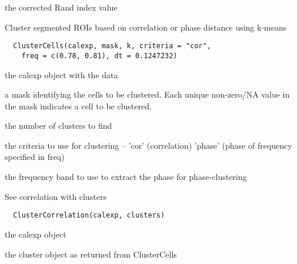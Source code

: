 \documentclass[a4paper]{book}
\begin{document}
%
\begin{Value}
the corrected Rand index value
\end{Value}
%
\begin{Description}\relax
Cluster segmented ROIs based on correlation or phase
distance using k-means
\end{Description}
%
\begin{Usage}
\begin{verbatim}
  ClusterCells(calexp, mask, k, criteria = "cor",
    freq = c(0.78, 0.81), dt = 0.1247232)
\end{verbatim}
\end{Usage}
%
\begin{Arguments}
\begin{ldescription}
\item[\code{calexp}] the calexp object with the data

\item[\code{mask}] a mask identifying the cells to be clustered.
Each unique non-zero/NA value in the mask indicates a
cell to be clustered.

\item[\code{k}] the number of clusters to find

\item[\code{criteria}] the criteria to use for clustering --
'cor' (correlation) 'phase' (phase of frequency specified
in freq)

\item[\code{freq}] the frequency band to use to extract the
phase for phase-clustering
\end{ldescription}
\end{Arguments}
%
\begin{Description}\relax
See correlation with clusters
\end{Description}
%
\begin{Usage}
\begin{verbatim}
  ClusterCorrelation(calexp, clusters)
\end{verbatim}
\end{Usage}
%
\begin{Arguments}
\begin{ldescription}
\item[\code{calexp}] the calexp object

\item[\code{clusters}] the cluster object as returned from
ClusterCells
\end{ldescription}
\end{Arguments}
\end{document}
